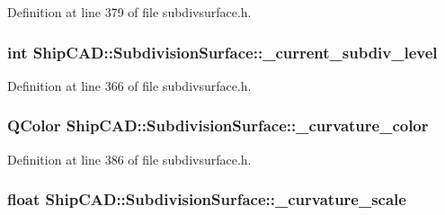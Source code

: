 Definition at line 379 of file subdivsurface.\-h.

\hypertarget{classShipCAD_1_1SubdivisionSurface_a9e5424746eced5d0a06ccbe4055bd06f}{
\subsubsection[{\-\_\-current\-\_\-subdiv\-\_\-level}]{\setlength{\rightskip}{0pt plus 5cm}int Ship\-C\-A\-D\-::\-Subdivision\-Surface\-::\-\_\-current\-\_\-subdiv\-\_\-level\hspace{0.3cm}{\ttfamily [protected]}}}\label{classShipCAD_1_1SubdivisionSurface_a9e5424746eced5d0a06ccbe4055bd06f}


Definition at line 366 of file subdivsurface.\-h.

\hypertarget{classShipCAD_1_1SubdivisionSurface_a05a83d21996abb065abe7f3109f35a73}{
\subsubsection[{\-\_\-curvature\-\_\-color}]{\setlength{\rightskip}{0pt plus 5cm}Q\-Color Ship\-C\-A\-D\-::\-Subdivision\-Surface\-::\-\_\-curvature\-\_\-color\hspace{0.3cm}{\ttfamily [protected]}}}\label{classShipCAD_1_1SubdivisionSurface_a05a83d21996abb065abe7f3109f35a73}


Definition at line 386 of file subdivsurface.\-h.

\hypertarget{classShipCAD_1_1SubdivisionSurface_acf241b41a8ca897306decbbab8e44c69}{
\subsubsection[{\-\_\-curvature\-\_\-scale}]{\setlength{\rightskip}{0pt plus 5cm}float Ship\-C\-A\-D\-::\-Subdivision\-Surface\-::\-\_\-curvature\-\_\-scale\hspace{0.3cm}{\ttfamily [protected]}}}\label{classShipCAD_1_1SubdivisionSurface_acf241b41a8ca897306decbbab8e44c69}



